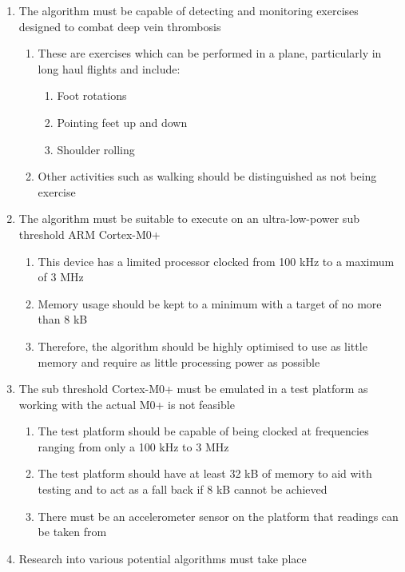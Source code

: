 \begin{enumerate}
  \item The algorithm must be capable of detecting and monitoring exercises designed to combat deep vein thrombosis
  \begin{enumerate}[label*=\arabic*.]
    \item These are exercises which can be performed in a plane, particularly in long haul flights and include:
    \begin{enumerate}[label*=\arabic*.]
      \item Foot rotations
      \item Pointing feet up and down
      \item Shoulder rolling
    \end{enumerate}
    \item Other activities such as walking should be distinguished as not being exercise
  \end{enumerate}
  \item The algorithm must be suitable to execute on an ultra-low-power sub threshold ARM Cortex-M0+
  \begin{enumerate}[label*=\arabic*.]
    \item This device has a limited processor clocked from 100 kHz to a maximum of 3 MHz
    \item Memory usage should be kept to a minimum with a target of no more than 8 kB
    \item Therefore, the algorithm should be highly optimised to use as little memory and require as little processing power as possible
  \end{enumerate}
  \item The sub threshold Cortex-M0+ must be emulated in a test platform as working with the actual M0+ is not feasible
  \begin{enumerate}[label*=\arabic*.]
    \item The test platform should be capable of being clocked at frequencies ranging from only a 100 kHz to 3 MHz
    \item The test platform should have at least 32 kB of memory to aid with testing and to act as a fall back if 8 kB cannot be achieved
    \item There must be an accelerometer sensor on the platform that readings can be taken from
  \end{enumerate}
  \item Research into various potential algorithms must take place
  \begin{enumerate}[label*=\arabic*.]

\end{enumerate}
\end{enumerate}
